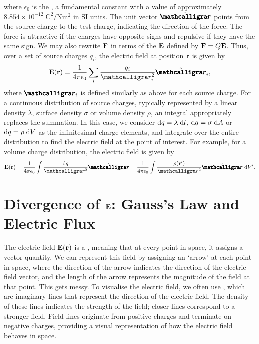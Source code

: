 where $\epsilon_{0}$ is the , a fundamental constant with a value of approximately $8.854 \times 10^{-12} \; \mathrm{C^{2}/Nm^{2}}$ in SI units. The unit vector $\hat{\bcurs{r}}$ points from the source charge to the test charge, indicating the direction of the force. The force is attractive if the charges have opposite signs and repulsive if they have the same sign. We may also rewrite $\mathbf{F}$ in terms of the  $\mathbf{E}$ defined by $\mathbf{F} = Q \mathbf{E}$. Thus, over a set of source charges $q_{i}$, the electric field at position $\mathbf{r}$ is given by
\begin{align}
    \bv{E}(\bv{r}) = \frac{1}{4 \pi \epsilon_{0}} \sum_{i} \frac{q_{i}}{\curs{r}_{i}^{2}} \hat{\bcurs{r}}_{i},
\end{align}
where $\bcurs{r}_{i}$ is defined similarly as above for each source charge. For a continuous distribution of source charges, typically represented by a linear density $\lambda$, surface density $\sigma$ or volume density $\rho$, an integral appropriately replaces the summation. In this case, we consider $\mathrm{d}q = \lambda \; \mathrm{d}l$, $\mathrm{d}q = \sigma \; \mathrm{d}A$ or $\mathrm{d}q = \rho \; \mathrm{d}V$ as the infinitesimal charge elements, and integrate over the entire distribution to find the electric field at the point of interest. For example, for a volume charge distribution, the electric field is given by
\begin{align}
    \bv{E}(\bv{r}) = \frac{1}{4 \pi \epsilon_{0}} \int \frac{\di{q}}{\curs{r}^{2}} \hat{\bcurs{r}} = \frac{1}{4 \pi \epsilon_{0}} \int \frac{\rho(\bv{r}')}{\curs{r}^{2}} \hat{\bcurs{r}} \; \di{V}'.
\end{align}

\section{Divergence of $\mathbf{E}$: Gauss's Law and Electric Flux}

The electric field $\mathbf{E}(\mathbf{r})$ is a , meaning that at every point in space, it assigns a vector quantity. We can represent this field by assigning an `arrow' at each point in space, where the direction of the arrow indicates the direction of the electric field vector, and the length of the arrow represents the magnitude of the field at that point. This gets messy. To visualise the electric field, we often use , which are imaginary lines that represent the direction of the electric field. The density of these lines indicates the strength of the field; closer lines correspond to a stronger field. Field lines originate from positive charges and terminate on negative charges, providing a visual representation of how the electric field behaves in space.

